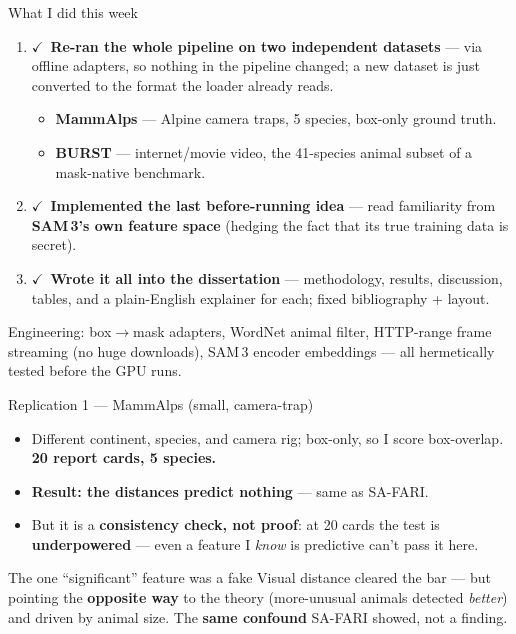 \documentclass[aspectratio=169,11pt]{beamer}
\newcommand{\ck}{{\color{forest}$\checkmark$}}
\begin{document}
\begin{frame}{What I did this week}
  \begin{enumerate}\footnotesize
    \item \ck\ \textbf{Re-ran the whole pipeline on two independent datasets} --- via offline adapters, so
          nothing in the pipeline changed; a new dataset is just converted to the format the loader already reads.
    \begin{itemize}\scriptsize
      \item \textbf{MammAlps} --- Alpine camera traps, 5 species, box-only ground truth.
      \item \textbf{BURST} --- internet/movie video, the 41-species animal subset of a mask-native benchmark.
    \end{itemize}
    \item \ck\ \textbf{Implemented the last before-running idea} --- read familiarity from \textbf{SAM\,3's own
          feature space} (hedging the fact that its true training data is secret).
    \item \ck\ \textbf{Wrote it all into the dissertation} --- methodology, results, discussion, tables, and a
          plain-English explainer for each; fixed bibliography + layout.
  \end{enumerate}
  \vspace{0.2em}
  {\scriptsize Engineering: box$\to$mask adapters, WordNet animal filter, HTTP-range frame streaming (no huge
  downloads), SAM\,3 encoder embeddings --- all hermetically tested before the GPU runs.}
\end{frame}

\begin{frame}{Replication 1 --- MammAlps (small, camera-trap)}
  \begin{itemize}\footnotesize
    \item Different continent, species, and camera rig; box-only, so I score box-overlap. \textbf{20 report
          cards, 5 species.}
    \item \textbf{Result: the distances predict nothing} --- same as SA-FARI.
    \item But it is a \textbf{consistency check, not proof}: at 20 cards the test is \textbf{underpowered} ---
          even a feature I \emph{know} is predictive can't pass it here.
  \end{itemize}
  \vspace{0.3em}
  \begin{block}{The one ``significant'' feature was a fake}
    \footnotesize
    Visual distance cleared the bar --- but pointing the \textbf{opposite way} to the theory (more-unusual
    animals detected \emph{better}) and driven by animal size. The \textbf{same confound} SA-FARI showed, not a
    finding.
  \end{block}
\end{frame}
\end{document}
